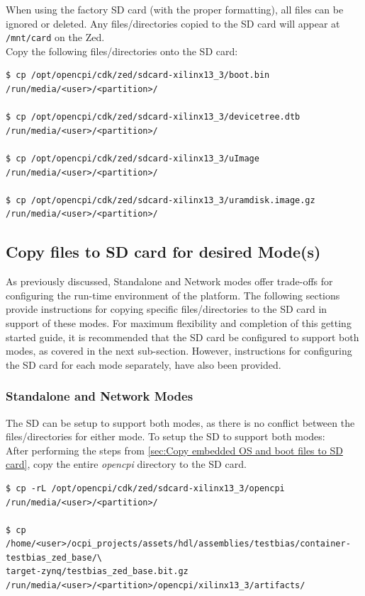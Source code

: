 \noindent When using the factory SD card (with the proper formatting), all files can be ignored or deleted. Any files/directories copied to the SD card will appear at \texttt{/mnt/card} on the Zed.\\

\noindent Copy the following files/directories onto the SD card:
\begin{verbatim}
$ cp /opt/opencpi/cdk/zed/sdcard-xilinx13_3/boot.bin /run/media/<user>/<partition>/

$ cp /opt/opencpi/cdk/zed/sdcard-xilinx13_3/devicetree.dtb /run/media/<user>/<partition>/

$ cp /opt/opencpi/cdk/zed/sdcard-xilinx13_3/uImage /run/media/<user>/<partition>/

$ cp /opt/opencpi/cdk/zed/sdcard-xilinx13_3/uramdisk.image.gz /run/media/<user>/<partition>/
\end{verbatim}\medskip

\subsection{Copy files to SD card for desired Mode(s)}
As previously discussed, Standalone and Network modes offer trade-offs for configuring the run-time environment of the platform. The following sections provide instructions for copying specific files/directories to the SD card in support of these modes. For maximum flexibility and completion of this getting started guide, it is recommended that the SD card be configured to support both modes, as covered in the next sub-section. However, instructions for configuring the SD card for each mode separately, have also been provided.

\subsubsection{Standalone and Network Modes}
The SD can be setup to support both modes, as there is no conflict between the files/directories for either mode. To setup the SD to support both modes:\\

\noindent After performing the steps from \ref{sec:Copy embedded OS and boot files to SD card}, copy the entire \textit{opencpi} directory to the SD card.

\begin{verbatim}
$ cp -rL /opt/opencpi/cdk/zed/sdcard-xilinx13_3/opencpi /run/media/<user>/<partition>/

$ cp /home/<user>/ocpi_projects/assets/hdl/assemblies/testbias/container-testbias_zed_base/\
target-zynq/testbias_zed_base.bit.gz /run/media/<user>/<partition>/opencpi/xilinx13_3/artifacts/
\end{verbatim}


